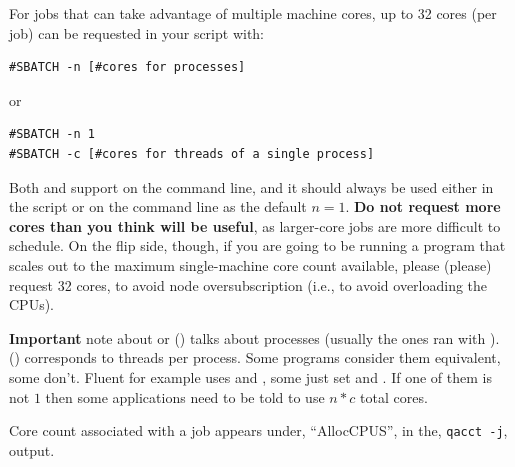 For jobs that can take advantage of multiple machine cores, up to 32 cores
(per job) can be requested in your script with: 

\begin{verbatim}
#SBATCH -n [#cores for processes] 
\end{verbatim}

or

\begin{verbatim}
#SBATCH -n 1
#SBATCH -c [#cores for threads of a single process]
\end{verbatim}

Both  and  support  on the command line,
and it should always be used either in the script or on the command line as the
default $n=1$.
\textbf{Do not request more cores than you think will be useful}, as larger-core
jobs are more difficult to schedule. On the flip side, though, if you 
are going to be running a program that scales out to the maximum single-machine
core count available, please (please) request 32 cores, to avoid node 
oversubscription (i.e., to avoid overloading the CPUs).

\textbf{Important} note about  or 
() talks about processes (usually the ones ran with ).
 () corresponds to threads per process.
Some programs consider them equivalent, some don't. Fluent for example
uses  and ,
some just set  and .
If one of them is not $1$ then some applications need to be told to
use $n*c$ total cores.


Core count associated with a job appears under,
``AllocCPUS'', in the, \texttt{qacct -j}, output.

